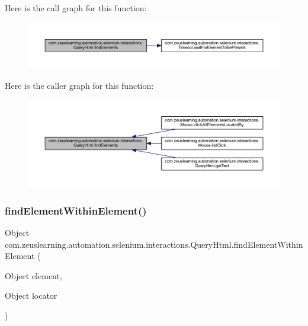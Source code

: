 Here is the call graph for this function\+:
\nopagebreak
\begin{figure}[H]
\begin{center}
\leavevmode
\includegraphics[width=350pt]{dc/d41/classcom_1_1zeuslearning_1_1automation_1_1selenium_1_1interactions_1_1QueryHtml_a3161a36666e8a81d86855c82b39e20ce_cgraph}
\end{center}
\end{figure}
Here is the caller graph for this function\+:
\nopagebreak
\begin{figure}[H]
\begin{center}
\leavevmode
\includegraphics[width=350pt]{dc/d41/classcom_1_1zeuslearning_1_1automation_1_1selenium_1_1interactions_1_1QueryHtml_a3161a36666e8a81d86855c82b39e20ce_icgraph}
\end{center}
\end{figure}
\hypertarget{classcom_1_1zeuslearning_1_1automation_1_1selenium_1_1interactions_1_1QueryHtml_ae9f39730724b96bc25230b5c5b55dec1}{}\label{classcom_1_1zeuslearning_1_1automation_1_1selenium_1_1interactions_1_1QueryHtml_ae9f39730724b96bc25230b5c5b55dec1} 
\subsubsection{\texorpdfstring{find\+Element\+Within\+Element()}{findElementWithinElement()}}
{\footnotesize\ttfamily Object com.\+zeuslearning.\+automation.\+selenium.\+interactions.\+Query\+Html.\+find\+Element\+Within\+Element (\begin{DoxyParamCaption}\item[{Object}]{element,  }\item[{Object}]{locator }\end{DoxyParamCaption})\hspace{0.3cm}{\ttfamily [inline]}}

